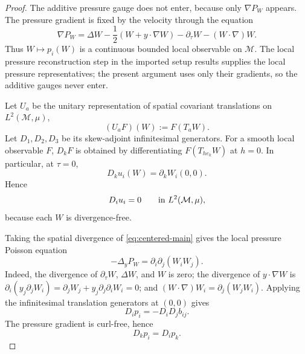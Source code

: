 \documentclass[11pt]{amsart}
\numberwithin{equation}{section}
\theoremstyle{plain}
\theoremstyle{definition}
\theoremstyle{remark}
\newcommand{\calM}{\mathcal M}
\begin{document}
\begin{proof}
The additive pressure gauge does not enter, because only \(\nabla P_W\) appears.
The pressure gradient is fixed by the velocity through the equation
\[
   \nabla P_W
   =
   \Delta W-\frac12(W+y\cdot\nabla W)
   -\partial_\tau W-(W\cdot\nabla)W .
\]
Thus \(W\mapsto p_i(W)\) is a continuous bounded local observable on
\(\calM\).  The local pressure reconstruction step in
the imported setup results supplies the local pressure representatives; the present
argument uses only their gradients, so the additive gauges never enter.

Let \(U_a\) be the unitary representation of spatial covariant translations
on \(L^2(\calM,\mu)\),
\[
   (U_aF)(W):=F(T_aW).
\]
Let \(D_1,D_2,D_3\) be its skew-adjoint infinitesimal generators.  For a smooth
local observable \(F\), \(D_kF\) is obtained by differentiating
\(F(T_{he_k}W)\) at \(h=0\).  In particular, at \(\tau=0\),
\[
   D_k u_i(W)=\partial_kW_i(0,0).
\]
Hence
\begin{equation}\label{eq:state-div-free}
   D_i u_i=0
   \qquad\hbox{in }L^2(\calM,\mu),
\end{equation}
because each \(W\) is divergence-free.

Taking the spatial divergence of \eqref{eq:centered-main} gives the local
pressure Poisson equation
\begin{equation}\label{eq:local-pressure-poisson-core}
   -\Delta_yP_W=\partial_i\partial_j(W_iW_j).
\end{equation}
Indeed, the divergence of \(\partial_\tau W\), \(\Delta W\), and \(W\) is
zero; the divergence of \(y\cdot\nabla W\) is
\(\partial_i(y_j\partial_jW_i)=\partial_jW_j+y_j\partial_j\partial_iW_i=0\);
and \((W\cdot\nabla)W_i=\partial_j(W_jW_i)\).  Applying the infinitesimal
translation generators at \((0,0)\) gives
\begin{equation}\label{eq:state-pressure-divergence}
   D_i p_i=-D_iD_jb_{ij}.
\end{equation}
The pressure gradient is curl-free, hence
\begin{equation}\label{eq:state-pressure-curl}
   D_kp_i=D_ip_k .
\end{equation}


\end{proof}
\end{document}
